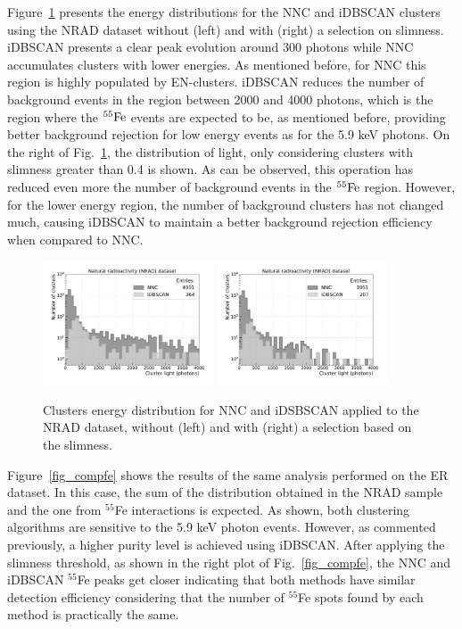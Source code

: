 \documentclass[a4paper,11pt]{article}
\begin{document}
Figure~\ref{fig_compcosmic} presents the energy distributions for the NNC and iDBSCAN clusters using the NRAD dataset without (left) and with (right) a selection on slimness.
iDBSCAN presents a clear peak evolution around 300 photons while NNC accumulates clusters with lower energies. As mentioned before, for NNC this region is highly populated by EN-clusters.
iDBSCAN reduces the number of background events in the region between 2000 and 4000 photons, which is the region where the $\rm ^{55}Fe$ events are expected to be, as mentioned before, providing better background rejection for low energy events as for the 5.9 keV photons.
On the right of Fig.~\ref{fig_compcosmic}, the distribution of light, only considering clusters with slimness greater than 0.4 is shown. As can be observed, this operation has reduced even more the number of background events in the $\rm ^{55}Fe$ region. 
However, for the lower energy region, the number of background clusters has not changed much, causing iDBSCAN to maintain a better background rejection efficiency when compared to NNC.


\begin{figure}[ht]
\centering
\includegraphics[width=0.45\textwidth]{LigthYield_Cos_wo.pdf}
\includegraphics[width=0.45\textwidth]{LigthYield_Cos_Slim.pdf}
\caption{Clusters energy distribution for NNC and iDSBSCAN applied to the NRAD dataset, without (left) and with (right) a selection based on the slimness.}
\label{fig_compcosmic}
\end{figure}

Figure~\ref{fig_compfe} shows the results of the same analysis performed on the ER dataset. In this case, the  sum of the distribution obtained in the NRAD sample and the one from $^{55}$Fe interactions is expected. As shown, both clustering algorithms are sensitive to the 5.9 keV photon events. However, as commented previously, a higher purity level is achieved using iDBSCAN.
After applying the slimness threshold, as shown in the right plot of Fig.~\ref{fig_compfe}, the NNC and iDBSCAN  $^{55}$Fe peaks get closer indicating that both methods have similar detection efficiency considering that the number of $^{55}$Fe spots found by each method is practically the same.  
\end{document}
